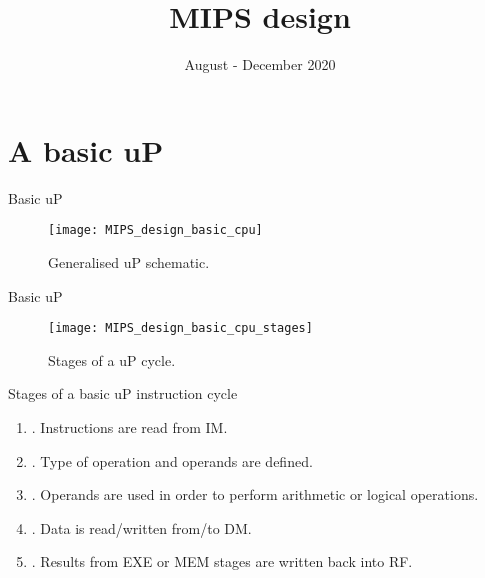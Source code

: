 \documentclass[]{slides}
\title{MIPS design}
\date{August - December 2020}
\begin{document}
\printpdftrue %
\begin{frame} \titlepage \end{frame}

\section{A basic \acl{uP}}
% 
\begin{frame}{Basic \ac{uP}}
  \begin{figure}
  \centering
  \texttt{[image: MIPS\_design\_basic\_cpu]}
  \caption{Generalised \ac{uP} schematic.}
  \label{Figure:non_pipelined_cpu}
  \end{figure}
\end{frame}

% 
\begin{frame}{Basic \ac{uP}}
  \begin{figure}
  \centering
  \texttt{[image: MIPS\_design\_basic\_cpu\_stages]}
  \caption{Stages of a \ac{uP} cycle.}
  \label{Figure:non_pipelined_cpu_stages}
  \end{figure}
\end{frame}


% 
\begin{frame}{Stages of a basic \ac{uP} instruction cycle}
\begin{enumerate}
\item {}. Instructions are read from \ac{IM}.
\item {}. Type of operation and operands are defined.
\item {}. Operands are used in order to perform arithmetic or logical operations.
\item {}. Data is read/written from/to \ac{DM}.
\item {}. Results from \ac{EXE} or \ac{MEM} stages are written back into \ac{RF}.
\end{enumerate}
\end{frame}

% 
\end{document}

